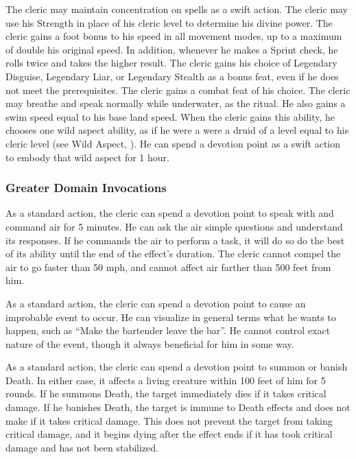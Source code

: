     The cleric may maintain concentration on  spells as a swift action.
    The cleric may use his Strength in place of his cleric level to determine his divine power.
    The cleric gains a  foot bonus to his speed in all movement modes, up to a maximum of double his original speed.
    In addition, whenever he makes a Sprint check, he rolls twice and takes the higher result.
    The cleric gains his choice of Legendary Disguise, Legendary Liar, or Legendary Stealth as a bonus feat, even if he does not meet the prerequisites.
    The cleric gains a combat feat of his choice.
     The cleric may breathe and speak normally while underwater, as the 
    ritual.
    He also gains a swim speed equal to his base land speed.
    When the cleric gains this ability, he chooses one wild aspect ability, as if he were a were a druid of a level equal to his cleric level (see Wild Aspect, ).
    He can spend a devotion point as a swift action to embody that wild aspect for 1 hour.

\subsubsection{Greater Domain Invocations}\label{Greater Domain Invocations}

    As a standard action, the cleric can spend a devotion point to speak with and command air for 5 minutes.
    He can ask the air simple questions and understand its responses.
    If he commands the air to perform a task, it will do so do the best of its ability until the end of the effect's duration.
    The cleric cannot compel the air to go faster than 50 mph, and cannot affect air farther than 500 feet from him.

    As a standard action, the cleric can spend a devotion point to cause an improbable event to occur.
    He can visualize in general terms what he wants to happen, such as ``Make the bartender leave the bar''.
    He cannot control exact nature of the event, though it always beneficial for him in some way.

    As a standard action, the cleric can spend a devotion point to summon or banish Death.
    In either case, it affects a living creature within 100 feet of him for 5 rounds.
    If he summons Death, the target immediately dies if it takes critical damage.
    If he banishes Death, the target is immune to Death effects and does not make  if it takes critical damage.
    This does not prevent the target from taking critical damage, and it begins dying after the effect ends if it has took critical damage and has not been stabilized.

